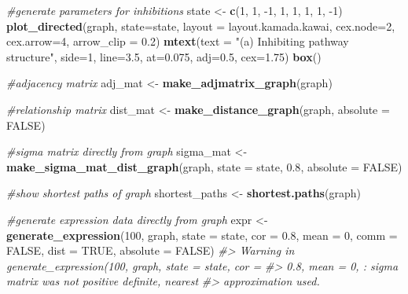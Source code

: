 \documentclass[]{article}
\newenvironment{Shaded}{\begin{snugshade}}{\end{snugshade}}
\newcommand{\CommentTok}[1]{\textcolor[rgb]{0.56,0.35,0.01}{\textit{#1}}}
\newcommand{\DataTypeTok}[1]{\textcolor[rgb]{0.13,0.29,0.53}{#1}}
\newcommand{\DecValTok}[1]{\textcolor[rgb]{0.00,0.00,0.81}{#1}}
\newcommand{\FloatTok}[1]{\textcolor[rgb]{0.00,0.00,0.81}{#1}}
\newcommand{\KeywordTok}[1]{\textcolor[rgb]{0.13,0.29,0.53}{\textbf{#1}}}
\newcommand{\NormalTok}[1]{#1}
\newcommand{\OtherTok}[1]{\textcolor[rgb]{0.56,0.35,0.01}{#1}}
\newcommand{\StringTok}[1]{\textcolor[rgb]{0.31,0.60,0.02}{#1}}
\begin{document}
\begin{Shaded}
\begin{Highlighting}[]

\CommentTok{#generate parameters for inhibitions}
\NormalTok{state <-}\StringTok{ }\KeywordTok{c}\NormalTok{(}\DecValTok{1}\NormalTok{, }\DecValTok{1}\NormalTok{, }\DecValTok{-1}\NormalTok{, }\DecValTok{1}\NormalTok{, }\DecValTok{1}\NormalTok{, }\DecValTok{1}\NormalTok{, }\DecValTok{1}\NormalTok{, }\DecValTok{-1}\NormalTok{)}
\KeywordTok{plot_directed}\NormalTok{(graph, }\DataTypeTok{state=}\NormalTok{state, }\DataTypeTok{layout =}\NormalTok{ layout.kamada.kawai,}
              \DataTypeTok{cex.node=}\DecValTok{2}\NormalTok{, }\DataTypeTok{cex.arrow=}\DecValTok{4}\NormalTok{, }\DataTypeTok{arrow_clip =} \FloatTok{0.2}\NormalTok{)}
\KeywordTok{mtext}\NormalTok{(}\DataTypeTok{text =} \StringTok{"(a) Inhibiting pathway structure"}\NormalTok{, }\DataTypeTok{side=}\DecValTok{1}\NormalTok{, }\DataTypeTok{line=}\FloatTok{3.5}\NormalTok{, }\DataTypeTok{at=}\FloatTok{0.075}\NormalTok{, }\DataTypeTok{adj=}\FloatTok{0.5}\NormalTok{, }\DataTypeTok{cex=}\FloatTok{1.75}\NormalTok{)}
\KeywordTok{box}\NormalTok{()}

\CommentTok{#adjacency matrix}
\NormalTok{adj_mat <-}\StringTok{ }\KeywordTok{make_adjmatrix_graph}\NormalTok{(graph)}

\CommentTok{#relationship matrix}
\NormalTok{dist_mat <-}\StringTok{ }\KeywordTok{make_distance_graph}\NormalTok{(graph, }\DataTypeTok{absolute =} \OtherTok{FALSE}\NormalTok{)}

\CommentTok{#sigma matrix directly from graph}
\NormalTok{sigma_mat <-}\StringTok{ }\KeywordTok{make_sigma_mat_dist_graph}\NormalTok{(graph, }\DataTypeTok{state =}\NormalTok{ state, }\FloatTok{0.8}\NormalTok{, }\DataTypeTok{absolute =} \OtherTok{FALSE}\NormalTok{)}

\CommentTok{#show shortest paths of graph}
\NormalTok{shortest_paths <-}\StringTok{ }\KeywordTok{shortest.paths}\NormalTok{(graph)}

\CommentTok{#generate expression data directly from graph}
\NormalTok{expr <-}\StringTok{ }\KeywordTok{generate_expression}\NormalTok{(}\DecValTok{100}\NormalTok{, graph, }\DataTypeTok{state =}\NormalTok{ state, }\DataTypeTok{cor =} \FloatTok{0.8}\NormalTok{, }\DataTypeTok{mean =} \DecValTok{0}\NormalTok{, }\DataTypeTok{comm =} \OtherTok{FALSE}\NormalTok{,}
                            \DataTypeTok{dist =} \OtherTok{TRUE}\NormalTok{, }\DataTypeTok{absolute =} \OtherTok{FALSE}\NormalTok{)}
\CommentTok{#> Warning in generate_expression(100, graph, state = state, cor =}
\CommentTok{#> 0.8, mean = 0, : sigma matrix was not positive definite, nearest}
\CommentTok{#> approximation used.}


\end{Highlighting}
\end{Shaded}
\end{document}

